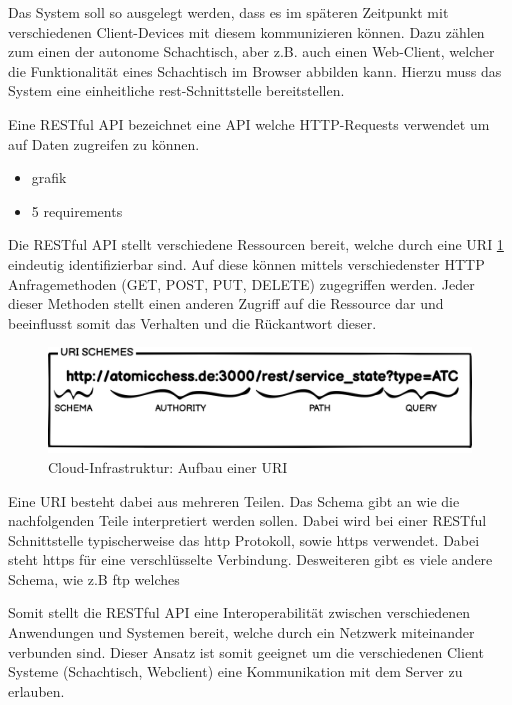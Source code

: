 Das System soll so ausgelegt werden, dass es im späteren Zeitpunkt mit
verschiedenen Client-Devices mit diesem kommunizieren können. Dazu
zählen zum einen der autonome Schachtisch, aber z.B. auch einen
Web-Client, welcher die Funktionalität eines Schachtisch im Browser
abbilden kann. Hierzu muss das System eine einheitliche
\gls{rest}-Schnittstelle bereitstellen.

Eine RESTful API bezeichnet eine API welche HTTP-Requests verwendet um
auf Daten zugreifen zu können.

\begin{itemize}
\tightlist
\item
  grafik
\item
  5 requirements
\end{itemize}

Die RESTful API stellt verschiedene Ressourcen bereit, welche durch eine
URI \ref{ATC_URI_SCHEMES} eindeutig identifizierbar sind. Auf diese
können mittels verschiedenster HTTP Anfragemethoden (GET, POST, PUT,
DELETE) zugegriffen werden. Jeder dieser Methoden stellt einen anderen
Zugriff auf die Ressource dar und beeinflusst somit das Verhalten und
die Rückantwort dieser.

\begin{figure}
\centering
\includegraphics{images/ATC_URI_SCHEMES.png}
\caption{Cloud-Infrastruktur: Aufbau einer URI \label{ATC_URI_SCHEMES}}
\end{figure}

Eine URI besteht dabei aus mehreren Teilen. Das Schema gibt an wie die
nachfolgenden Teile interpretiert werden sollen. Dabei wird bei einer
RESTful Schnittstelle typischerweise das \gls{http} Protokoll, sowie
\gls{https} verwendet. Dabei steht \gls{https} für eine verschlüsselte
Verbindung. Desweiteren gibt es viele andere Schema, wie z.B \gls{ftp}
welches

Somit stellt die RESTful API eine Interoperabilität zwischen
verschiedenen Anwendungen und Systemen bereit, welche durch ein Netzwerk
miteinander verbunden sind. Dieser Ansatz ist somit geeignet um die
verschiedenen Client Systeme (Schachtisch, Webclient) eine Kommunikation
mit dem Server zu erlauben.

